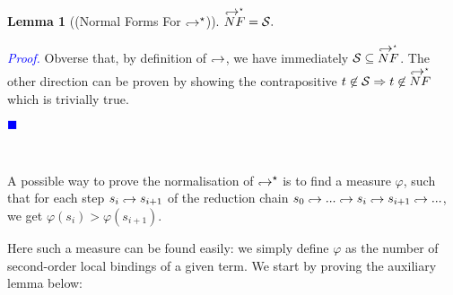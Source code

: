 \documentclass[a4paper,11pt,oneside]{article}
\theoremstyle{plain}
\newtheorem{lemma}[definition]{Lemma}
\renewenvironment{proof}{\noindent \begin{adjustwidth}{1.5em}{} \textcolor{blue}{\textit{Proof.}}}
{{\begin{tiny}\textcolor{blue}{$\blacksquare$}\end{tiny}}
\end{adjustwidth}~\\\noindent}
\newcommand{\inlS}{\mathcal{S}}
\newcommand{\hookdownarrow}{\mathrel{\rotatebox[origin=c]{180}{$\hookleftarrow$}}}
\newcommand{\inlletarr}{\hookdownarrow}
\newcommand{\inlletstar}{\hookdownarrow^{\star}}
\newcommand{\inlletplus}{\inlletstar}
\newcommand{\inlletNF}{\overset{\inlletplus}{NF}}
\newcommand{\ilarr}{\hookdownarrow}
\newcommand{\ilarrt}{\ilarr^{\star}}
\newcommand{\il}[2]{#1 \ilarr #2}
\begin{document}
\begin{lemma}[(Normal Forms For $\inlletstar$)] 
$ \inlletNF  = \inlS.$
\label{inllet-nforms-l}
\end{lemma}
\begin{proof}
Obverse that, by definition of $\inlletarr$, we have immediately $\inlS \subseteq  \inlletNF$. The other direction can be proven by showing the contrapositive $t \not\in \inlS \Rightarrow t \not\in \inlletNF$ which is trivially true.
\end{proof}


\hypertarget{measure-idea}{}
 A possible way to prove the normalisation of $\ilarrt$ is to find a measure $\varphi$, such that for each step $\il{s_{i}}{s_{i+1}}$ of the reduction chain $ s_0 \ilarr ... \ilarr s_i \ilarr s_{i+1} \ilarr ...$, we get $\varphi(s_{i}) >  \varphi(s_{i+1}) $. 

Here such a measure can be found easily: we simply define $\varphi$ as the number of second-order local bindings of a given term. We start by proving the auxiliary lemma below:
\end{document}
